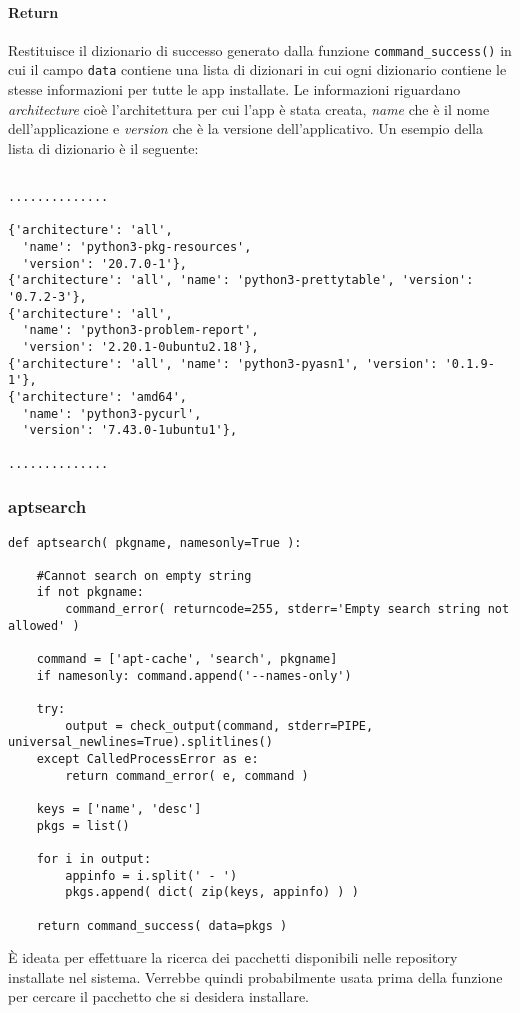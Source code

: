 \documentclass[11pt]{article}
\begin{document}
\paragraph{Return}
Restituisce il dizionario di successo generato dalla funzione \texttt{command\_success()} in cui il campo \texttt{data}
contiene una lista di dizionari in cui ogni dizionario contiene le stesse informazioni per tutte le app installate. 
Le informazioni riguardano \textit{architecture} cioè l'architettura per cui l'app è stata creata, \textit{name}
che è il nome dell'applicazione e \textit{version} che è la versione dell'applicativo. Un esempio della lista
di dizionario è il seguente:
\begin{lstlisting}

..............

{'architecture': 'all',
  'name': 'python3-pkg-resources',
  'version': '20.7.0-1'},
{'architecture': 'all', 'name': 'python3-prettytable', 'version': '0.7.2-3'},
{'architecture': 'all',
  'name': 'python3-problem-report',
  'version': '2.20.1-0ubuntu2.18'},
{'architecture': 'all', 'name': 'python3-pyasn1', 'version': '0.1.9-1'},
{'architecture': 'amd64',
  'name': 'python3-pycurl',
  'version': '7.43.0-1ubuntu1'},

..............

\end{lstlisting}

\subsubsection{aptsearch}\label{aptsearch}
\begin{lstlisting}
def aptsearch( pkgname, namesonly=True ):

    #Cannot search on empty string
    if not pkgname:
        command_error( returncode=255, stderr='Empty search string not allowed' )

    command = ['apt-cache', 'search', pkgname]
    if namesonly: command.append('--names-only')

    try:
        output = check_output(command, stderr=PIPE, universal_newlines=True).splitlines()
    except CalledProcessError as e:
        return command_error( e, command )

    keys = ['name', 'desc']
    pkgs = list()

    for i in output:
        appinfo = i.split(' - ')
        pkgs.append( dict( zip(keys, appinfo) ) )

    return command_success( data=pkgs )
\end{lstlisting}
È ideata per effettuare la ricerca dei pacchetti disponibili nelle repository installate nel sistema.
Verrebbe quindi probabilmente usata prima della funzione  per cercare il pacchetto
che si desidera installare.
\end{document}
